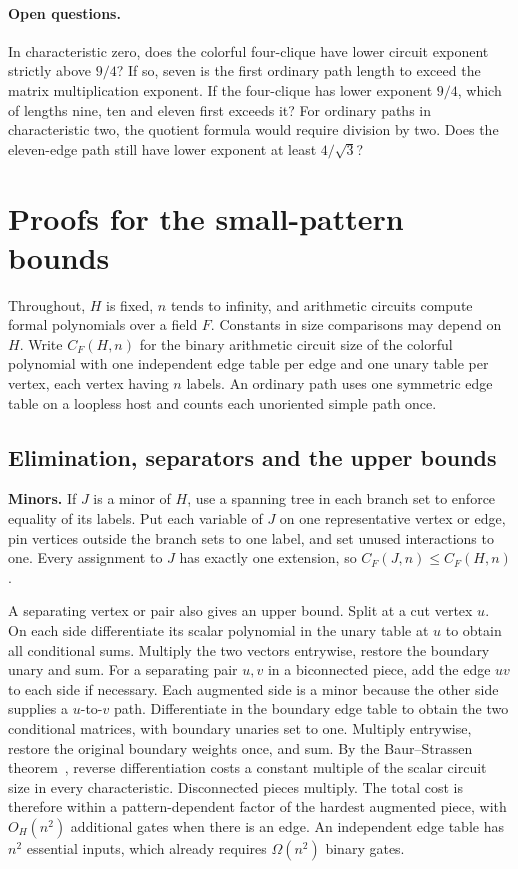 \documentclass[11pt,letterpaper]{article}
\begin{document}
\paragraph{Open questions.}
In characteristic zero, does the colorful four-clique have lower circuit exponent
strictly above \(9/4\)? If so, seven is the first ordinary path length to exceed
the matrix multiplication exponent. If the four-clique has lower exponent
\(9/4\), which of lengths nine, ten and eleven first exceeds it?
For ordinary paths in characteristic two, the quotient formula would require
division by two. Does the eleven-edge path still have lower exponent at least \(4/\sqrt3\)?

\clearpage
\appendix
\section{Proofs for the small-pattern bounds}\label{proofs-for-the-small-pattern-bounds}

Throughout, \(H\) is fixed, \(n\) tends to infinity, and arithmetic circuits compute formal polynomials over a field \(F\). Constants in size comparisons may depend on \(H\). Write \(C_F(H,n)\) for the binary arithmetic circuit size of the colorful polynomial with one independent edge table per edge and one unary table per vertex, each vertex having \(n\) labels. An ordinary path uses one symmetric edge table on a loopless host and counts each unoriented simple path once.

\subsection{Elimination, separators and the upper bounds}\label{elimination-separators-and-the-upper-bounds}

\textbf{Minors.} If \(J\) is a minor of \(H\), use a spanning tree in each branch set to enforce equality of its labels. Put each variable of \(J\) on one representative vertex or edge, pin vertices outside the branch sets to one label, and set unused interactions to one. Every assignment to \(J\) has exactly one extension, so \(C_F(J,n)\le C_F(H,n)\).

A separating vertex or pair also gives an upper bound. Split at a cut vertex \(u\). On each side differentiate its scalar polynomial in the unary table at \(u\) to obtain all conditional sums. Multiply the two vectors entrywise, restore the boundary unary and sum. For a separating pair \(u,v\) in a biconnected piece, add the edge \(uv\) to each side if necessary. Each augmented side is a minor because the other side supplies a \(u\)-to-\(v\) path. Differentiate in the boundary edge table to obtain the two conditional matrices, with boundary unaries set to one. Multiply entrywise, restore the original boundary weights once, and sum. By the Baur--Strassen theorem~\cite{baur-strassen}, reverse differentiation costs a constant multiple of the scalar circuit size in every characteristic. Disconnected pieces multiply. The total cost is therefore within a pattern-dependent factor of the hardest augmented piece, with \(O_H(n^2)\) additional gates when there is an edge. An independent edge table has \(n^2\) essential inputs, which already requires \(\Omega(n^2)\) binary gates.
\end{document}
